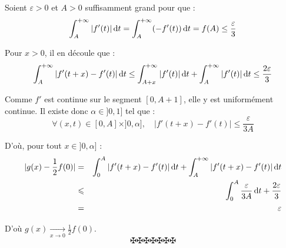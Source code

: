 Soient $\varepsilon > 0$ et $A > 0$ suffisamment grand pour que :
\[ \int_A^{+ \infty} |f' (t) | \hspace{0.17em} \text{d} t = \int_A^{+ \infty}
   (- f' (t)) \hspace{0.17em} \text{d} t = f (A) \leq \frac{\varepsilon}{3} \]


Pour $x > 0$, il en d{\'e}coule que :
\[ \int_A^{+ \infty} |f' (t + x) - f' (t) | \hspace{0.17em} \text{d} t \leq
   \int_{A + x}^{+ \infty} |f' (t) | \hspace{0.17em} \text{d} t + \int_A^{+
   \infty} |f' (t) | \hspace{0.17em} \text{d} t \leq \frac{2 \varepsilon}{3}
\]


Comme $f'$ est continue sur le segment $[0, A + 1]$, elle y est
uniform{\'e}ment continue. Il existe donc $\alpha \in] 0, 1]$ tel que :
\[ \forall (x, t) \in [0, A] \times] 0, \alpha], \quad |f' (t + x) - f' (t) |
   \leq \frac{\varepsilon}{3 A} \]


D'o{\`u}, pour tout $x \in] 0, \alpha]$ :
\begin{eqnarray*}
  |g (x) - \frac{1}{2} f (0) | & = & \int_0^A |f' (t + x) - f' (t) |
  \hspace{0.17em} \text{d} t + \int_A^{+ \infty} |f' (t + x) - f' (t) |
  \hspace{0.17em} \text{d} t\\
  & \leqslant &  \int_0^A \frac{\varepsilon}{3 A}  \hspace{0.17em} \text{d} t
  + \frac{2 \varepsilon}{3}\\
  & = & \varepsilon
\end{eqnarray*}


D'o{\`u} $g (x) \underset{x \rightarrow 0}{\rightarrow} \frac{1}{2} f (0)$.
\[ \maltese \maltese \maltese \maltese \maltese \maltese \maltese \]
